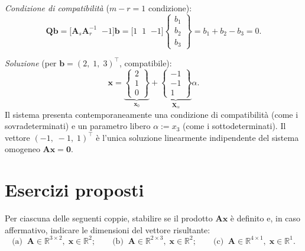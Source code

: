 \noindent\textit{Condizione di compatibilit\`a} ($m-r=1$ condizione):
\begin{equation}
	\bm{Q}\bm{b}
	= \bigl[\bm{A}_s\bm{A}_r^{-1}\;\;{-1}\bigr]\bm{b}
	= \bigl[1\;\;1\;\;{-1}\bigr]
	\begin{Bmatrix} b_1 \\ b_2 \\ b_3 \end{Bmatrix}
	= b_1 + b_2 - b_3 = 0.
\end{equation}

\noindent\textit{Soluzione} (per $\bm{b}=(2,\;1,\;3)^\top$, compatibile):
\begin{equation}
	\bm{x}
	= \underbrace{\begin{Bmatrix} 2 \\ 1 \\ 0 \end{Bmatrix}}_{\bm{x}_0}
	+ \underbrace{\begin{Bmatrix} -1 \\ -1 \\ 1 \end{Bmatrix}}_{\bm{X}_\alpha} \alpha.
\end{equation}
Il sistema presenta contemporaneamente una condizione di compatibilit\`a (come
i sovradeterminati) e un parametro libero $\alpha := x_3$ (come i
sottodeterminati). Il vettore $(-1,\;-1,\;1)^\top$ \`e l'unica soluzione
linearmente indipendente del sistema omogeneo $\bm{A}\bm{x}=\bm{0}$.



\section{Esercizi proposti}


\begin{esercizio} 
	Per ciascuna delle seguenti coppie, stabilire se il prodotto
	$\bm{A}\bm{x}$ \`e definito e, in caso affermativo, indicare le
	dimensioni del vettore risultante:
	\begin{equation*}
		\text{(a)}\;\;
		\bm{A}\in\mathbb{R}^{3\times 2},\;\bm{x}\in\mathbb{R}^{2};
		\qquad
		\text{(b)}\;\;
		\bm{A}\in\mathbb{R}^{2\times 3},\;\bm{x}\in\mathbb{R}^{2};
		\qquad
		\text{(c)}\;\;
		\bm{A}\in\mathbb{R}^{4\times 1},\;\bm{x}\in\mathbb{R}^{1}.
	\end{equation*}
\end{esercizio} 


